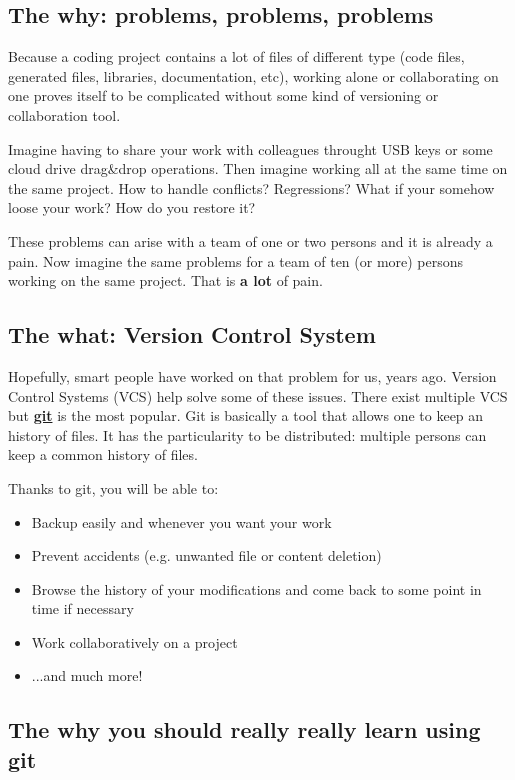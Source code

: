 \documentclass[12pt]{article}
\let\oldhref\href
\renewcommand{\href}[2]{\oldhref{#1}{\bfseries#2}}
\begin{document}
\subsection{The why: problems, problems, problems}

Because a coding project contains a lot of files of different type (code files, generated files, libraries, documentation, etc), working alone or collaborating on one proves itself to be complicated without some kind of versioning or collaboration tool.

Imagine having to share your work with colleagues throught USB keys or some cloud drive drag\&drop operations. Then imagine working all at the same time on the same project. How to handle conflicts? Regressions? What if your somehow loose your work? How do you restore it?

These problems can arise with a team of one or two persons and it is already a pain. Now imagine the same problems for a team of ten (or more) persons working on the same project. That is \textbf{a lot} of pain.

\subsection{The what: Version Control System}

Hopefully, smart people have worked on that problem for us, years ago. Version Control Systems (VCS) help solve some of these issues. There exist multiple VCS but \href{https://git-scm.com/}{git} is the most popular. Git is basically a tool that allows one to keep an history of files. It has the particularity to be distributed: multiple persons can keep a common history of files.

Thanks to git, you will be able to:

\begin{itemize}
\item Backup easily and whenever you want your work
\item Prevent accidents (e.g. unwanted file or content deletion)
\item Browse the history of your modifications and come back to some point in time if necessary
\item Work collaboratively on a project
\item ...and much more!
\end{itemize}


\subsection{The why you should really really learn using git}
\end{document}
